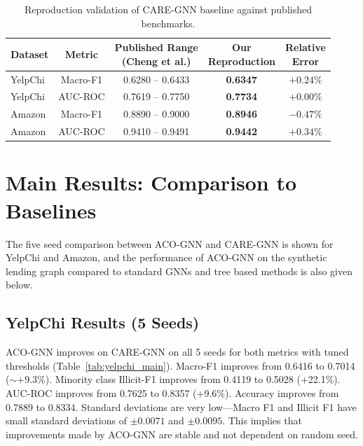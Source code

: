 \begin{table}[htbp]
\centering
\small
\setlength{\tabcolsep}{4.5pt}
\caption[Reproduction validation of CARE-GNN baseline]{Reproduction validation of CARE-GNN baseline against published benchmarks.}
\label{tab:reproduction_results}
\begin{tabular*}{\textwidth}{@{\extracolsep{\fill}}lcccc}
\toprule
\textbf{Dataset} & \textbf{Metric} & \makecell{\textbf{Published Range}\\\textbf{(Cheng et al.)}} & \makecell{\textbf{Our}\\\textbf{Reproduction}} & \makecell{\textbf{Relative}\\\textbf{Error}} \\
\midrule
YelpChi & Macro-F1 & 0.6280 -- 0.6433 & \textbf{0.6347} & $+0.24\%$ \\
YelpChi & AUC-ROC  & 0.7619 -- 0.7750 & \textbf{0.7734} & $+0.00\%$ \\
Amazon  & Macro-F1 & 0.8890 -- 0.9000 & \textbf{0.8946} & $-0.47\%$ \\
Amazon  & AUC-ROC  & 0.9410 -- 0.9491 & \textbf{0.9442} & $+0.34\%$ \\
\bottomrule
\end{tabular*}
\end{table}

\section[Main Results -- Comparison to Baselines]{Main Results: Comparison to Baselines}
\label{sec:main_comparison}

The five seed comparison between ACO-GNN and CARE-GNN is shown for YelpChi and Amazon, and the performance of ACO-GNN on the synthetic lending graph compared to standard GNNs and tree based methods is also given below.

\subsection{YelpChi Results (5 Seeds)}

ACO-GNN improves on CARE-GNN on all 5 seeds for both metrics with tuned thresholds (Table~\ref{tab:yelpchi_main}). Macro-F1 improves from 0.6416 to 0.7014 ($\sim+9.3\%$). Minority class Illicit-F1 improves from 0.4119 to 0.5028 (+22.1\%). AUC-ROC improves from 0.7625 to 0.8357 (+9.6\%). Accuracy improves from 0.7889 to 0.8334. Standard deviations are very low---Macro F1 and Illicit F1 have small standard deviations of $\pm 0.0071$ and $\pm 0.0095$. This implies that improvements made by ACO-GNN are stable and not dependent on random seed.

